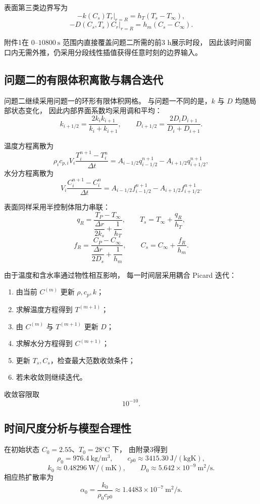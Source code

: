 \documentclass[UTF8,a4paper,11pt]{ctexart}
\begin{document}
表面第三类边界写为
\[
-k(C_s)\left.T_r\right|_{r=R}
=
h_T(T_s-T_\infty),
\]
\[
-D(C_s,T_s)\left.C_r\right|_{r=R}
=
h_m(C_s-C_\infty).
\]

附件1在 $0$--$10800~\mathrm s$ 范围内直接覆盖问题二所需的前3 h展示时段，
因此该时间窗口内无需外推，仍采用分段线性插值获得任意时刻的边界输入。

\subsection{问题二的有限体积离散与耦合迭代}

问题二继续采用问题一的环形有限体积网格。
与问题一不同的是，$k$ 与 $D$ 均随局部状态变化，
因此内部界面系数均采用调和平均：
\[
k_{i+1/2}
=
\frac{2k_i k_{i+1}}{k_i+k_{i+1}},
\qquad
D_{i+1/2}
=
\frac{2D_iD_{i+1}}{D_i+D_{i+1}}.
\]

温度方程离散为
\[
\rho_i c_{p,i}V_i
\frac{T_i^{n+1}-T_i^n}{\Delta t}
=
A_{i-1/2}q_{i-1/2}^{n+1}
-
A_{i+1/2}q_{i+1/2}^{n+1},
\]
水分方程离散为
\[
V_i
\frac{C_i^{n+1}-C_i^n}{\Delta t}
=
A_{i-1/2}f_{i-1/2}^{n+1}
-
A_{i+1/2}f_{i+1/2}^{n+1}.
\]

表面同样采用半控制体阻力串联：
\[
q_R=
\frac{T_P-T_\infty}
{\dfrac{\Delta r}{2k_s}+\dfrac1{h_T}},
\qquad
T_s=T_\infty+\frac{q_R}{h_T},
\]
\[
f_R=
\frac{C_P-C_\infty}
{\dfrac{\Delta r}{2D_s}+\dfrac1{h_m}},
\qquad
C_s=C_\infty+\frac{f_R}{h_m}.
\]

由于温度和含水率通过物性相互影响，
每一时间层采用耦合 Picard 迭代：
\begin{enumerate}
    \item 由当前 $C^{(m)}$ 更新 $\rho,c_p,k$；
    \item 求解温度方程得到 $T^{(m+1)}$；
    \item 由 $C^{(m)}$ 与 $T^{(m+1)}$ 更新 $D$；
    \item 求解水分方程得到 $C^{(m+1)}$；
    \item 更新 $T_s,C_s$，检查最大范数收敛条件；
    \item 若未收敛则继续迭代。
\end{enumerate}

收敛容限取
\[
10^{-10}.
\]

\subsection{时间尺度分析与模型合理性}

在初始状态 $C_0=2.55$、$T_0=28^\circ\mathrm C$ 下，
由附录3得到
\[
\rho_0=976.4~\mathrm{kg/m^3},
\qquad
c_{p0}\approx3415.30~\mathrm{J/(kgK)},
\]
\[
k_0\approx0.48296~\mathrm{W/(mK)},
\qquad
D_0\approx5.642\times10^{-9}~\mathrm{m^2/s}.
\]
相应热扩散率为
\[
\alpha_0=\frac{k_0}{\rho_0c_{p0}}
\approx1.4483\times10^{-7}~\mathrm{m^2/s}.
\]
\end{document}
